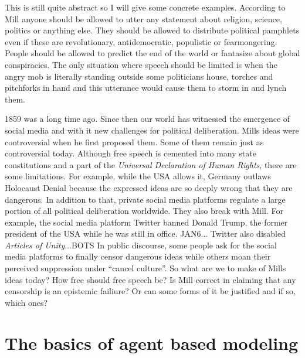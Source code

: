 \documentclass{essay-formal}
\begin{document}
This is still quite abstract so I will give some concrete examples. According to Mill anyone should be allowed to utter any statement about religion, science, politics or anything else. They should be allowed to distribute political pamphlets even if these are revolutionary, antidemocratic, populistic or fearmongering. People should be allowed to predict the end of the world or fantasize about global conspiracies. The only situation where speech should be limited is when the angry mob is literally standing outside some politicians house, torches and pitchforks in hand and this utterance would cause them to storm in and lynch them.\parencite[Page?][]{mill}

1859 was a long time ago. Since then our world has witnessed the emergence of social media and with it new challenges for political deliberation. Mills ideas were controversial when he first proposed them. Some of them remain just as controversial today. Although free speech is cemented into many state constitutions and a part of the \emph{Universal Declaration of Human Rights}, there are some limitations. For example, while the USA allows it, Germany outlaws Holocaust Denial because the expressed ideas are so deeply wrong that they are dangerous. In addition to that, private social media platforms regulate a large portion of all political deliberation worldwide. They also break with Mill. For example, the social media platform Twitter banned Donald Trump, the former president of the USA while he was still in office. JAN6... Twitter also disabled \emph{Articles of Unity}...BOTS\cite{RESEARCH} In public discourse, some people ask for the social media platforms to finally censor dangerous ideas while others moan their perceived suppression under \enquote{cancel culture}. So what are we to make of Mills ideas today? How free should free speech be? Is Mill correct in claiming that any censorship is an epistemic failiure? Or can some forms of it be justified and if so, which ones?

\section{The basics of agent based modeling}
\end{document}
